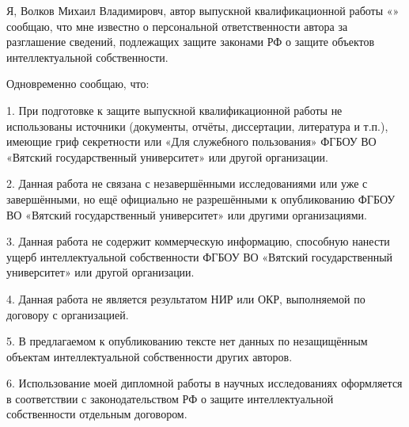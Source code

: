 \begin{singlespace}

	\newcommand{\authorfullname}{Волков Михаил Владимировч}
	\renewcommand{\authorwithinitials}{Волков М. В.}
	\renewcommand{\headofdepartment}{М. Л. Долженкова}

	Я, \authorfullname , автор выпускной квалификационной
	работы «\topic» сообщаю, что мне известно о персональной ответственности автора
	за разглашение сведений, подлежащих защите законами РФ о защите объектов
	интеллектуальной собственности.

	Одновременно сообщаю, что:

	1. При подготовке к защите выпускной квалификационной работы не
	использованы источники (документы, отчёты, диссертации, литература и т.п.),
	имеющие гриф секретности или «Для служебного пользования» ФГБОУ ВО
	«Вятский государственный университет» или другой организации.

	2. Данная работа не связана с незавершёнными исследованиями или уже
	с завершёнными, но ещё официально не разрешёнными к опубликованию
	ФГБОУ ВО «Вятский государственный университет» или другими
	организациями.

	3. Данная работа не содержит коммерческую информацию, способную
	нанести ущерб интеллектуальной собственности ФГБОУ ВО «Вятский
	государственный университет» или другой организации.

	4. Данная работа не является результатом НИР или ОКР, выполняемой по
	договору с организацией.

	5. В предлагаемом к опубликованию тексте нет данных по
	незащищённым объектам интеллектуальной собственности других авторов.

	6. Использование моей дипломной работы в научных исследованиях
	оформляется в соответствии с законодательством РФ о защите интеллектуальной
	собственности отдельным договором.

	\newcommand{\daysize}{2em}

	\newcommand{\confirm}{
		\noindent
		Сведения по авторской справке подтверждаю:~«\uline{\hspace{\daysize}}»
	}

	\newcommand{\verticalspacesize}{2em}

	\newcommand{\rightindent}{2em}

	\newcommand{\customtheyear}{\the\year~г.}

	\newcommand{\rightindentwithyear}{\widthof{\customtheyear}+\rightindent}

	\newcommand{\signaturesize}{6.6em}


\end{singlespace}
